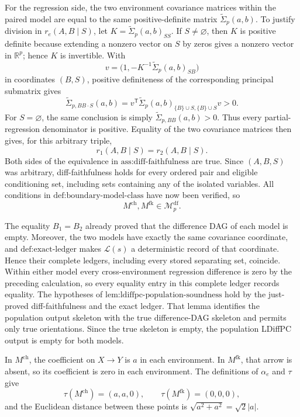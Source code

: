 For the regression side, the two environment covariance matrices within the paired model are equal to the same positive-definite matrix \(\widetilde\Sigma_p(a,b)\).  To justify division in \(r_e(A,B\mid S)\), let \(K=\widetilde\Sigma_p(a,b)_{SS}\).  If \(S\neq\varnothing\), then \(K\) is positive definite because extending a nonzero vector on \(S\) by zeros gives a nonzero vector in \(\mathbb R^p\); hence \(K\) is invertible.  With
\[
 v=\bigl(1,-K^{-1}\widetilde\Sigma_p(a,b)_{SB}\bigr)
\]
in coordinates \((B,S)\), positive definiteness of the corresponding principal submatrix gives
\[
 \widetilde\Sigma_{p,BB\cdot S}(a,b)
 =v^{\mathsf T}\widetilde\Sigma_p(a,b)_{\{B\}\cup S,\{B\}\cup S}v>0.
\]
For \(S=\varnothing\), the same conclusion is simply \(\widetilde\Sigma_{p,BB}(a,b)>0\).  Thus every partial-regression denominator is positive.  Equality of the two covariance matrices then gives, for this arbitrary triple,
\[
 r_1(A,B\mid S)=r_2(A,B\mid S).
\]
Both sides of the equivalence in \(\text{ass:diff-faithfulness}\) are true.  Since \((A,B,S)\) was arbitrary, diff-faithfulness holds for every ordered pair and eligible conditioning set, including sets containing any of the isolated variables.  All conditions in \(\text{def:boundary-model-class}\) have now been verified, so
\[
 M^{\mathrm{ch}},M^{\mathrm{fk}}\in\mathcal M_p^{\mathrm{df}}.
\]

The equality \(B_1=B_2\) already proved that the difference DAG of each model is empty.  Moreover, the two models have exactly the same covariance coordinate, and \(\text{def:exact-ledger}\) makes \(\mathcal L(s)\) a deterministic record of that coordinate.  Hence their complete ledgers, including every stored separating set, coincide.  Within either model every cross-environment regression difference is zero by the preceding calculation, so every equality entry in this complete ledger records equality.  The hypotheses of \(\text{lem:ldiffpc-population-soundness}\) hold by the just-proved diff-faithfulness and the exact ledger.  That lemma identifies the population output skeleton with the true difference-DAG skeleton and permits only true orientations.  Since the true skeleton is empty, the population LDiffPC output is empty for both models.

In \(M^{\mathrm{ch}}\), the coefficient on \(X\to Y\) is \(a\) in each environment.  In \(M^{\mathrm{fk}}\), that arrow is absent, so its coefficient is zero in each environment.  The definitions of \(\alpha_e\) and \(\tau\) give
\[
 \tau(M^{\mathrm{ch}})=(a,a,0),\qquad
 \tau(M^{\mathrm{fk}})=(0,0,0),
\]
and the Euclidean distance between these points is \(\sqrt{a^2+a^2}=\sqrt2|a|\).

